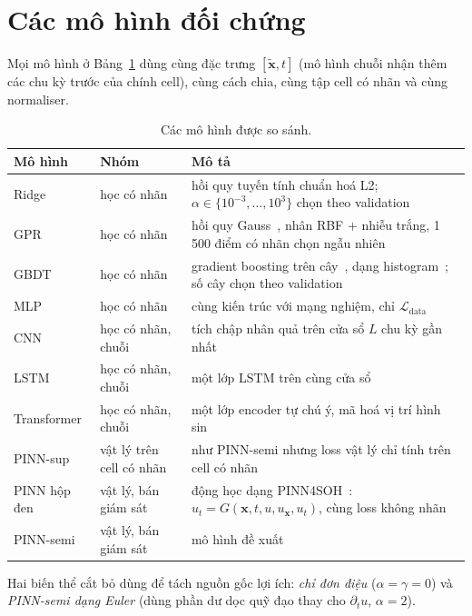 \documentclass[12pt,a4paper,oneside]{report}
\theoremstyle{plain}
\theoremstyle{definition}
\begin{document}
\section{Các mô hình đối chứng}\label{sec:baselines}

Mọi mô hình ở Bảng~\ref{tab:models} dùng cùng đặc trưng $[\tilde{\mathbf{x}}, t]$ (mô hình chuỗi nhận thêm các chu kỳ trước của chính cell), cùng cách chia, cùng tập cell có nhãn và cùng
normaliser.

\begin{table}[!htbp]\centering\small
\caption{Các mô hình được so sánh.}\label{tab:models}
\begin{tabularx}{\textwidth}{l>{\raggedright}p{3.2cm}>{\raggedright\arraybackslash}X}
\toprule
Mô hình & Nhóm & Mô tả \\
\midrule
Ridge & học có nhãn & hồi quy tuyến tính chuẩn hoá L2; $\alpha \in \{10^{-3},\dots,10^{3}\}$ chọn theo validation\\
GPR & học có nhãn & hồi quy Gauss~\cite{rasmussen2006}, nhân RBF + nhiễu trắng, 1\,500 điểm có nhãn chọn ngẫu nhiên\\
GBDT & học có nhãn & gradient boosting trên cây~\cite{friedman2001}, dạng histogram~\cite{ke2017}; số cây chọn theo validation\\
MLP & học có nhãn & cùng kiến trúc với mạng nghiệm, chỉ $\mathcal{L}_\text{data}$\\
CNN & học có nhãn, chuỗi & tích chập nhân quả trên cửa sổ $L$ chu kỳ gần nhất\\
LSTM & học có nhãn, chuỗi & một lớp LSTM trên cùng cửa sổ\\
Transformer & học có nhãn, chuỗi & một lớp encoder tự chú ý, mã hoá vị trí hình sin\\
PINN-sup & vật lý trên cell có nhãn & như PINN-semi nhưng loss vật lý chỉ tính trên cell có nhãn\\
PINN hộp đen & vật lý, bán giám sát & động học dạng PINN4SOH~\cite{wang2024}: $u_t = G(\mathbf{x}, t, u, u_\mathbf{x}, u_t)$, cùng loss không nhãn\\
PINN-semi & vật lý, bán giám sát & mô hình đề xuất\\
\bottomrule
\end{tabularx}
\end{table}

Hai biến thể cắt bỏ dùng để tách nguồn gốc lợi ích: \emph{chỉ đơn điệu} ($\alpha = \gamma = 0$) và
\emph{PINN-semi dạng Euler} (dùng phần dư dọc quỹ đạo thay cho $\partial_t u$, $\alpha = 2$).
\end{document}
